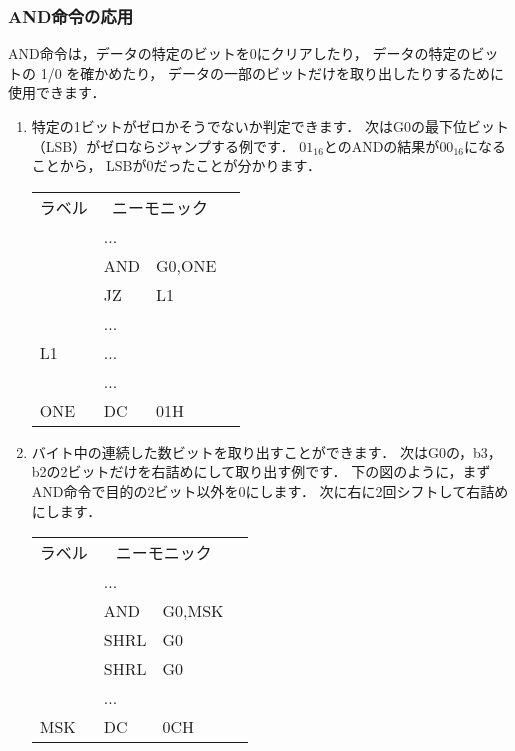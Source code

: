 \subsubsection{AND命令の応用}
AND命令は，データの特定のビットを0にクリアしたり，
データの特定のビットの 1/0 を確かめたり，
データの一部のビットだけを取り出したりするために使用できます．

\begin{enumerate}
\item 特定の1ビットがゼロかそうでないか判定できます．
次はG0の最下位ビット（LSB）がゼロならジャンプする例です．
$01_{16}$とのANDの結果が$00_{16}$になることから，
LSBが$0$だったことが分かります．

{\small\tt\begin{center}
\begin{tabular}{|l|l l|l}
\cline{1-3}
ラベル & \multicolumn{2}{|c|}{ニーモニック} & \\
\cline{1-3}
    & ...  &        & \\
    & AND  & G0,ONE & \\
    & JZ   & L1     & \\
    & ...  &        & \\
L1  & ...  &        & \\
    & ...  &        & \\
ONE & DC   & 01H    & \\
\cline{1-3}
\end{tabular}
\end{center}}

\item バイト中の連続した数ビットを取り出すことができます．
次はG0の，b3，b2の2ビットだけを右詰めにして取り出す例です．
下の図のように，まずAND命令で目的の2ビット以外を0にします．
次に右に2回シフトして右詰めにします．

{\small\tt\begin{center}
\begin{tabular}{|l|l l|l}
\cline{1-3}
ラベル & \multicolumn{2}{|c|}{ニーモニック} & \\
\cline{1-3}
    & ...  &        & \\
    & AND  & G0,MSK & \\
    & SHRL & G0     & \\
    & SHRL & G0     & \\
    & ...  &        & \\
MSK & DC   & 0CH    & \\
\cline{1-3}
\end{tabular}
\end{center}}


\end{enumerate}
